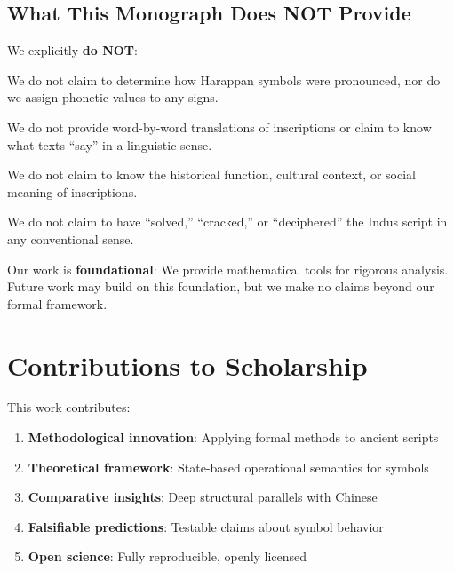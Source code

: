 \subsection{What This Monograph Does NOT Provide}

We explicitly \textbf{do NOT}:

\begin{nonclaim}
We do not claim to determine how Harappan symbols were pronounced, nor do we assign phonetic values to any signs.
\end{nonclaim}

\begin{nonclaim}
We do not provide word-by-word translations of inscriptions or claim to know what texts ``say'' in a linguistic sense.
\end{nonclaim}

\begin{nonclaim}
We do not claim to know the historical function, cultural context, or social meaning of inscriptions.
\end{nonclaim}

\begin{nonclaim}
We do not claim to have ``solved,'' ``cracked,'' or ``deciphered'' the Indus script in any conventional sense.
\end{nonclaim}

Our work is \textbf{foundational}: We provide mathematical tools for rigorous analysis. Future work may build on this foundation, but we make no claims beyond our formal framework.

\section{Contributions to Scholarship}

This work contributes:

\begin{enumerate}
    \item \textbf{Methodological innovation}: Applying formal methods to ancient scripts
    \item \textbf{Theoretical framework}: State-based operational semantics for symbols
    \item \textbf{Comparative insights}: Deep structural parallels with Chinese
    \item \textbf{Falsifiable predictions}: Testable claims about symbol behavior
    \item \textbf{Open science}: Fully reproducible, openly licensed
\end{enumerate}

